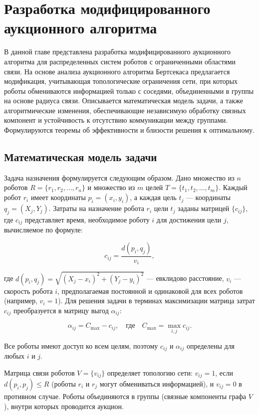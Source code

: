 \chapter{Разработка модифицированного аукционного алгоритма}
\label{ch2}

В данной главе представлена разработка модифицированного аукционного алгоритма для распределенных систем роботов с ограниченными областями связи. На основе анализа аукционного алгоритма Бертсекаса \cite{bertsekas1990} предлагается модификация, учитывающая топологические ограничения сети, при которых роботы обмениваются информацией только с соседями, объединенными в группы на основе радиуса связи. Описывается математическая модель задачи, а также алгоритмические изменения, обеспечивающие независимую обработку связных компонент и устойчивость к отсутствию коммуникации между группами. Формулируются теоремы об эффективности и близости решения к оптимальному.

\section{Математическая модель задачи}

Задача назначения формулируется следующим образом. Дано множество из \( n \) роботов \( R = \{r_1, r_2, \ldots, r_n\} \) и множество из \( m \) целей \( T = \{t_1, t_2, \ldots, t_m\} \). Каждый робот \( r_i \) имеет координаты \( p_i = (x_i, y_i) \), а каждая цель \( t_j \) --- координаты \( q_j = (X_j, Y_j) \). Затраты на назначение робота \( r_i \) цели \( t_j \) заданы матрицей \( \{c_{ij}\} \), где \( c_{ij} \) представляет время, необходимое роботу \( i \) для достижения цели \( j \), вычисляемое по формуле:

\[
c_{ij} = \frac{d(p_i, q_j)}{v_i},
\]

\noindent где \( d(p_i, q_j) = \sqrt{(X_j - x_i)^2 + (Y_j - y_i)^2} \) --- евклидово расстояние, \( v_i \) --- скорость робота \( i \), предполагаемая постоянной и одинаковой для всех роботов (например, \( v_i = 1 \)). Для решения задачи в терминах максимизации матрица затрат \( c_{ij} \) преобразуется в матрицу выгод \( \alpha_{ij} \):

\[
\alpha_{ij} = C_{\text{max}} - c_{ij}, \quad \text{где} \quad C_{\text{max}} = \max_{i,j} c_{ij}.
\]

Все роботы имеют доступ ко всем целям, поэтому \( c_{ij} \) и \( \alpha_{ij} \) определены для любых \( i \) и \( j \).

Матрица связи роботов \( V = \{v_{ij}\} \) определяет топологию сети: \( v_{ij} = 1 \), если \( d(p_i, p_j) \leq R \) (роботы \( r_i \) и \( r_j \) могут обмениваться информацией), и \( v_{ij} = 0 \) в противном случае. Роботы объединяются в группы (связные компоненты графа \( V \)), внутри которых проводится аукцион.

